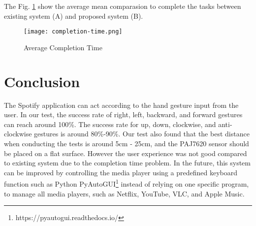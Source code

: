 \documentclass[conference,a4paper]{IEEEtran}
\begin{document}
The Fig. \ref{fig:completion-time} show the average mean comparasion to complete the tasks between existing system (A) and proposed system (B).

\begin{figure}[hbt!]
    \centering
    \texttt{[image: completion-time.png]}
    \caption{Average Completion Time}
    \label{fig:completion-time}
\end{figure}

\section{Conclusion}
The Spotify application can act according to the hand gesture input from the user. In our test, the success rate of right, left, backward, and forward gestures can reach around 100\%. The success rate for up, down, clockwise, and anti-clockwise gestures is around 80\%-90\%. Our test also found that the best distance when conducting the tests is around 5cm - 25cm, and the PAJ7620 sensor should be placed on a flat surface. However the user experience was not good compared to existing system due to the completion time problem. In the future, this system can be improved by controlling the media player using a predefined keyboard function such as Python PyAutoGUI\footnote{https://pyautogui.readthedocs.io/} instead of relying on one specific program,  to manage all media players, such as Netflix, YouTube, VLC, and Apple Music.
\end{document}

